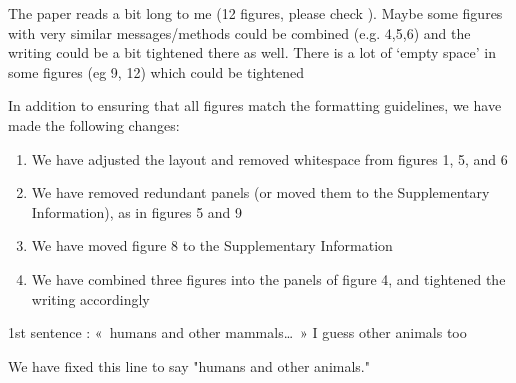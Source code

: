 \documentclass[12pt,american]{scrartcl}
\begin{document}
\begin{revcomment}
    The paper reads a bit long to me (12 figures, please check ). Maybe 
some figures with very similar messages/methods could be combined (e.g. 
4,5,6) and the writing could be a bit tightened there as well. There is a
 lot of ‘empty space’ in some figures (eg 9, 12) which could be 
tightened
\end{revcomment}
\begin{revresponse}
    In addition to ensuring that all figures match the formatting guidelines, we have made the following changes:
    \begin{enumerate}
        \item We have adjusted the layout and removed whitespace from figures 1, 5, and 6
        \item We have removed redundant panels (or moved them to the Supplementary Information), as in figures 5 and 9
        \item We have moved figure 8 to the Supplementary Information
        \item We have combined three figures into the panels of figure 4, and tightened the writing accordingly
    \end{enumerate}
\end{revresponse}

\begin{revcomment}
    1st sentence : « humans and other mammals… » I guess other animals too
\end{revcomment}
\begin{revresponse}
    We have fixed this line to say "humans and other animals."
\end{revresponse}

\reviewer
\end{document}
